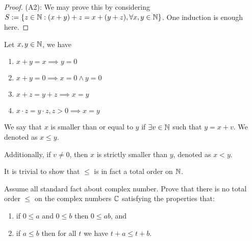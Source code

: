 \documentclass[11pt]{article}
\begin{document}
\begin{proof}
  \vspace{5pt}
  (A2): We may prove this by considering \(S := \{z\in\mathbb{N}: (x+y)+z = x+(y+z), \forall x,y \in \mathbb{N}\}\). One induction is enough here.
\end{proof}

\begin{proposition}
  Let \(x,y \in \mathbb{N}\), we have
  \begin{enumerate}
    \item \(x + y = x \implies y = 0\)
    \item \(x + y = 0 \implies x = 0 \land y = 0\)
    \item \(x + z = y + z \implies x = y\)
    \item \(x \cdot z = y \cdot z, z > 0 \implies x = y\)
  \end{enumerate}
\end{proposition}

\begin{definition}[Inequality on \(\N\)]
  We say that \(x\) is smaller than or equal to \(y\) if \(\exists v \in \mathbb{N}\) such that \(y=x+v\). We denoted as \(x \leq y\).

  Additionally, if \(v \neq 0\), then \(x\) is strictly smaller than \(y\), denoted as \(x < y\).
\end{definition}
It is trivial to show that \(\leq\) is in fact a total order on \(\N\).

\begin{problem}
  Assume all standard fact about complex number. Prove that there is no total order \(\leq\) on the complex numbers \(\mathbb{C}\) satisfying the properties that:
  \begin{enumerate}
    \item if \(0 \leq a\) and \(0 \leq b\) then \(0 \leq ab\), and
    \item if \(a \leq b\) then for all \(t\) we have \(t + a \leq t + b\).
  \end{enumerate}
\end{problem}
\begin{solution}
\end{solution}
\end{document}
